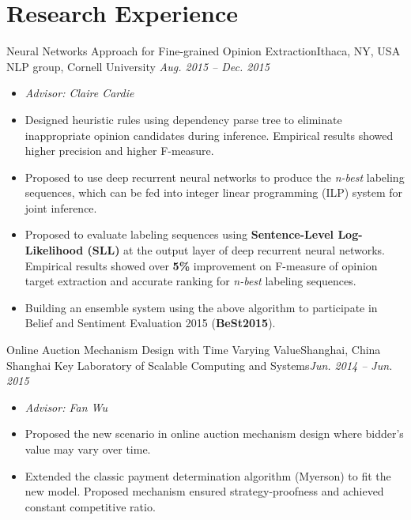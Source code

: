 \documentclass[letterpaper,12pt]{resume}
\begin{document}
\section{Research Experience}
\begin{itemize}
 
   \credential
     {Neural Networks Approach for Fine-grained Opinion Extraction}{Ithaca, NY, USA}
    {NLP group, Cornell University}
    {\textit{Aug. 2015 -- Dec. 2015}}
    {
    \begin{itemize}
     \item{ \textit{Advisor: Claire Cardie}}
    
    \item{Designed heuristic rules using dependency parse tree to eliminate inappropriate opinion candidates during inference. Empirical results showed higher precision and higher F-measure.}
    
    \item{Proposed to use deep recurrent neural networks to produce the \textit{n-best} labeling sequences, which can be fed into integer linear programming (ILP) system for joint inference.}
    
	 \item{Proposed to evaluate labeling sequences using \textbf{Sentence-Level Log-Likelihood (SLL)} at the output layer of deep recurrent neural networks. Empirical results showed over \textbf{5\%} improvement on F-measure of opinion target extraction and accurate  ranking for \textit{n-best} labeling sequences. }%
	 
	 \item{ Building an ensemble system using the above algorithm to participate in Belief and Sentiment Evaluation 2015 (\textbf{BeSt2015}).}
	 
	
    \end{itemize}
    }
    
      \credential
    {Online Auction Mechanism Design with Time Varying Value}{Shanghai, China}
    {Shanghai Key Laboratory of Scalable Computing and Systems}{\textit{Jun. 2014 -- Jun. 2015}}
    {
    \begin{itemize}
    \item{ \textit{Advisor: Fan Wu}}
     \item{ Proposed the new scenario in online auction mechanism design where bidder's value may vary over time.}
      \item{
	Extended the classic payment determination algorithm (Myerson) to fit the new model. Proposed mechanism ensured strategy-proofness and achieved constant competitive ratio. 
        }
  

\end{itemize}}
\end{itemize}
\end{document}
